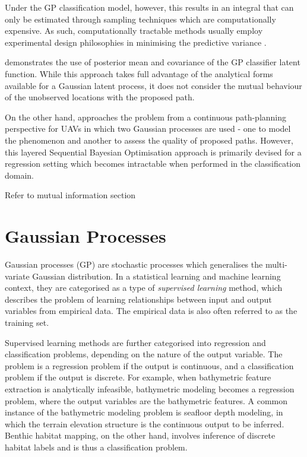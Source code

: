 		Under the GP classification model, however, this results in an integral that can only be estimated through sampling techniques which are computationally expensive. As such, computationally tractable methods usually employ experimental design philosophies in minimising the predictive variance \citep{AsherBender}.
		
		\cite{Kapoor} demonstrates the use of posterior mean and covariance of the GP classifier latent function. While this approach takes full advantage of the analytical forms available for a Gaussian latent process, it does not consider the mutual behaviour of the unobserved locations with the proposed path.
		
		On the other hand, \cite{Roman:SequentialBayesianOptimisation} approaches the problem from a continuous path-planning perspective for UAVs in which two Gaussian processes are used - one to model the phenomenon and another to assess the quality of proposed paths. However, this layered Sequential Bayesian Optimisation approach is primarily devised for a regression setting which becomes intractable when performed in the classification domain.
		
		Refer to mutual information section
		
	\section{Gaussian Processes}
	
		Gaussian processes (GP) are stochastic processes which generalises the multi-variate Gaussian distribution. In a statistical learning and machine learning context, they are categorised as a type of \textit{supervised learning} method, which describes the problem of learning relationships between input and output variables from empirical data. The empirical data is also often referred to as the training set.
		
		Supervised learning methods are further categorised into regression and classification problems, depending on the nature of the output variable. The problem is a regression problem if the output is continuous, and a classification problem if the output is discrete. For example, when bathymetric feature extraction is analytically infeasible, bathymetric modeling becomes a regression problem, where the output variables are the bathymetric features. A common instance of the bathymetric modeling problem is seafloor depth modeling, in which the terrain elevation structure is the continuous output to be inferred. Benthic habitat mapping, on the other hand, involves inference of discrete habitat labels and is thus a classification problem.
		
